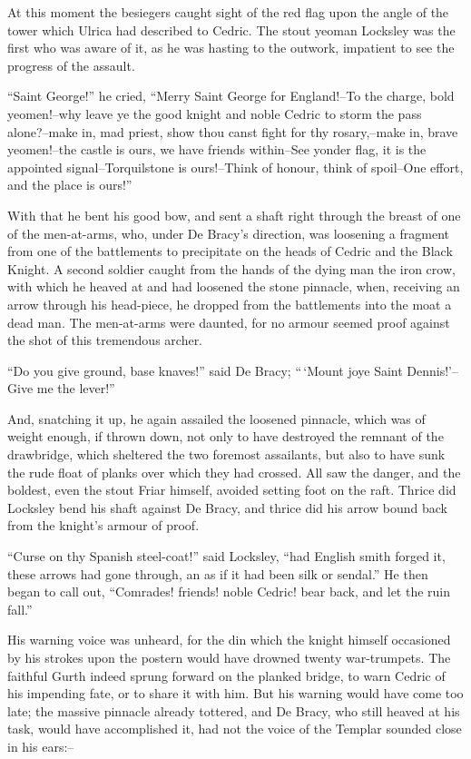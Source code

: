 At this moment the besiegers caught sight of the red flag upon the angle
of the tower which Ulrica had described to Cedric. The stout yeoman
Locksley was the first who was aware of it, as he was hasting to the
outwork, impatient to see the progress of the assault.

``Saint George!'' he cried, ``Merry Saint George for England!--To the
charge, bold yeomen!--why leave ye the good knight and noble Cedric to
storm the pass alone?--make in, mad priest, show thou canst fight for
thy rosary,--make in, brave yeomen!--the castle is ours, we have friends
within--See yonder flag, it is the appointed signal--Torquilstone is
ours!--Think of honour, think of spoil--One effort, and the place is
ours!''

With that he bent his good bow, and sent a shaft right through the
breast of one of the men-at-arms, who, under De Bracy's direction, was
loosening a fragment from one of the battlements to precipitate on the
heads of Cedric and the Black Knight. A second soldier caught from the
hands of the dying man the iron crow, with which he heaved at and had
loosened the stone pinnacle, when, receiving an arrow through his
head-piece, he dropped from the battlements into the moat a dead man.
The men-at-arms were daunted, for no armour seemed proof against the
shot of this tremendous archer.

``Do you give ground, base knaves!'' said De Bracy; ``\,`Mount joye
Saint Dennis!'--Give me the lever!''

And, snatching it up, he again assailed the loosened pinnacle, which was
of weight enough, if thrown down, not only to have destroyed the remnant
of the drawbridge, which sheltered the two foremost assailants, but also
to have sunk the rude float of planks over which they had crossed. All
saw the danger, and the boldest, even the stout Friar himself, avoided
setting foot on the raft. Thrice did Locksley bend his shaft against De
Bracy, and thrice did his arrow bound back from the knight's armour of
proof.

``Curse on thy Spanish steel-coat!'' said Locksley, ``had English smith
forged it, these arrows had gone through, an as if it had been silk or
sendal.'' He then began to call out, ``Comrades! friends! noble Cedric!
bear back, and let the ruin fall.''

His warning voice was unheard, for the din which the knight himself
occasioned by his strokes upon the postern would have drowned twenty
war-trumpets. The faithful Gurth indeed sprung forward on the planked
bridge, to warn Cedric of his impending fate, or to share it with him.
But his warning would have come too late; the massive pinnacle already
tottered, and De Bracy, who still heaved at his task, would have
accomplished it, had not the voice of the Templar sounded close in his
ears:--

